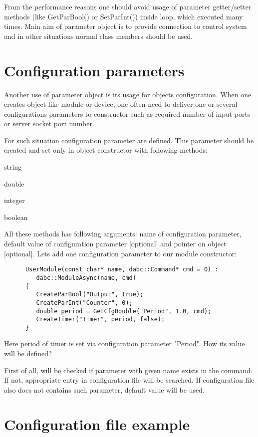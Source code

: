 From the performance reasons one should avoid usage of parameter getter/setter methods (like  
GetParBool() or SetParInt()) inside loop, which executed many times. Main aim of parameter
object is to provide connection to control system and in other situations normal class members should be used.


\section{Configuration parameters}

Another use of parameter object is its usage for objects configuration.
When one creates object like module or device, one often need to deliver 
one or several configurations parameters to constructor such as required
number of input ports or server socket port number. 

For such situation configuration parameter are defined.
This parameter should be created and set only in object constructor with following methods:
\bdes
\item[GetCfgStr]  string
\item[GetCfgDouble]   double 
\item[GetCfgInt]   integer
\item[GetCfgBool]   boolean 
\edes

All these methods has following arguments: name of configuration parameter, 
default value of configuration parameter [optional] and pointer on  object [optional].
Lets add one configuration parameter to our module constructor:

\begin{verbatim}
      UserModule(const char* name, dabc::Command* cmd = 0) : 
         dabc::ModuleAsync(name, cmd)
      {
         CreateParBool("Output", true);
         CreateParInt("Counter", 0);
         double period = GetCfgDouble("Period", 1.0, cmd);
         CreateTimer("Timer", period, false);
      }
\end{verbatim}

Here period of timer is set via configuration parameter "Period". How its value will be defined? 

First of all, will be checked if parameter with given name exists in the command.
If not, appropriate entry in configuration file will be searched. If configuration file also
does not contains such parameter, default value will be used.


\section{Configuration file example}

